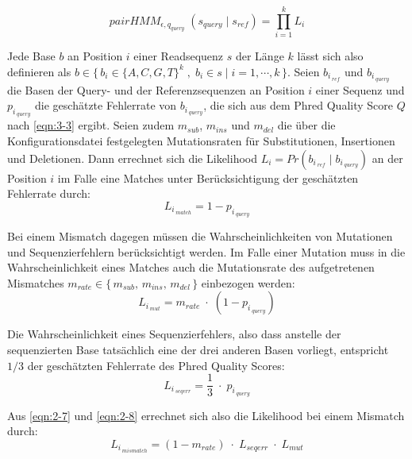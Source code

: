 \begin{equation} \label{eqn:2-5}
\tag{2-5}
pairHMM_{\epsilon, q_{query}} \;(s_{query}\;|\; s_{ref}) = \prod_{i=1}^{k}L_{i}
\end{equation}

Jede Base $ b $ an Position $ i $ einer Readsequenz $ s $ der Länge $ k $ lässt sich also definieren als $ b \in \{\,b_{i}\in \{A,C,G,T\}^k\;,\; b_{i} \in s \;|\; i = 1, \dotsb, k \,\}$. Seien $ b_{i\,_{ref}} $ und $ b_{i\,_{query}} $ die Basen der Query- und der Referenzsequenzen an Position $ i $ einer Sequenz und $  p_{i\,_{query}} $ die geschätzte Fehlerrate von $ b_{i\,_{query}} $, die sich aus dem Phred Quality Score $ Q $ nach  \eqref{eqn:3-3} ergibt. Seien zudem $ m_{sub} $, $ m_{ins} $ und $ m_{del} $ die über die Konfigurationsdatei festgelegten Mutationsraten für Substitutionen, Insertionen und Deletionen. Dann errechnet sich die Likelihood $ L_{i} = Pr(b_{i\,_{ref}}\;|\; b_{i\,_{query}})$ an der Position $ i $ im Falle eine Matches unter Berücksichtigung der geschätzten Fehlerrate durch:
\begin{equation} \label{eqn:2-6}
\tag{2-6}
L_{i\,_{match}} = 1 - p_{i\,_{query}}
\end{equation}

Bei einem Mismatch dagegen müssen die Wahrscheinlichkeiten von Mutationen und Sequenzierfehlern berücksichtigt werden. Im Falle einer Mutation muss in die Wahrscheinlichkeit eines Matches auch die Mutationsrate des aufgetretenen Mismatches $ m_{rate} \in \{\,m_{sub},\,  m_{ins},\, m_{del}\,\} $ einbezogen werden:
\begin{equation} \label{eqn:2-7}
\tag{2-7}
L_{i\,_{mut}} = m_{rate}\; \cdotp \;(1 - p_{i\,_{query}})
\end{equation}

Die Wahrscheinlichkeit eines Sequenzierfehlers, also dass anstelle der sequenzierten Base tatsächlich eine der drei anderen Basen vorliegt, entspricht $ 1/3 $ der geschätzten Fehlerrate des Phred Quality Scores:
\begin{equation} \label{eqn:2-8}
\tag{2-8}
L_{i\,_{seqerr}} = \frac{1}{3} \; \cdotp \; p_{i\,_{query}}
\end{equation}

Aus \eqref{eqn:2-7} und \eqref{eqn:2-8} errechnet sich also die Likelihood bei einem Mismatch durch:
\begin{equation} \label{eqn:2-9}
\tag{2-9}
L_{i\,_{mismatch}} = (1-m_{rate}) \; \cdotp \; L_{seqerr} \; \cdotp \; L_{mut}
\end{equation}

